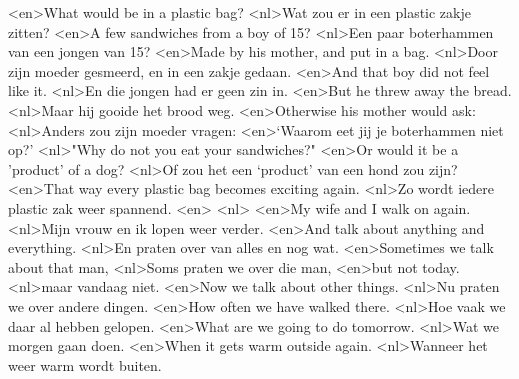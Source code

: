 <en>What would be in a plastic bag?
<nl>Wat zou er in een plastic zakje zitten?
<en>A few sandwiches from a boy of 15?
<nl>Een paar boterhammen van een jongen van 15?
<en>Made by his mother, and put in a bag.
<nl>Door zijn moeder gesmeerd, en in een zakje gedaan.
<en>And that boy did not feel like it.
<nl>En die jongen had er geen zin in.
<en>But he threw away the bread.
<nl>Maar hij gooide het brood weg.
<en>Otherwise his mother would ask:
<nl>Anders zou zijn moeder vragen:
<en>`Waarom eet jij je boterhammen niet op?'
<nl>"Why do not you eat your sandwiches?"
<en>Or  would it  be a 'product' of a dog?
<nl>Of zou het een `product' van een hond zou zijn?
<en>That way every plastic bag becomes exciting again.
<nl>Zo wordt iedere plastic zak weer spannend.
<en>
<nl>
<en>My wife and I walk on again.
<nl>Mijn vrouw en ik lopen weer verder.
<en>And talk about anything and everything.
<nl>En praten over van alles en nog wat.
<en>Sometimes we talk about that man,
<nl>Soms praten we over die man,
<en>but not today.
<nl>maar vandaag niet.
<en>Now we talk about other things.
<nl>Nu praten we over andere dingen.
<en>How often we have walked there.
<nl>Hoe vaak we daar al hebben gelopen.
<en>What are we going to do tomorrow.
<nl>Wat we morgen gaan doen.
<en>When it  gets warm outside again.
<nl>Wanneer het weer warm wordt buiten.
